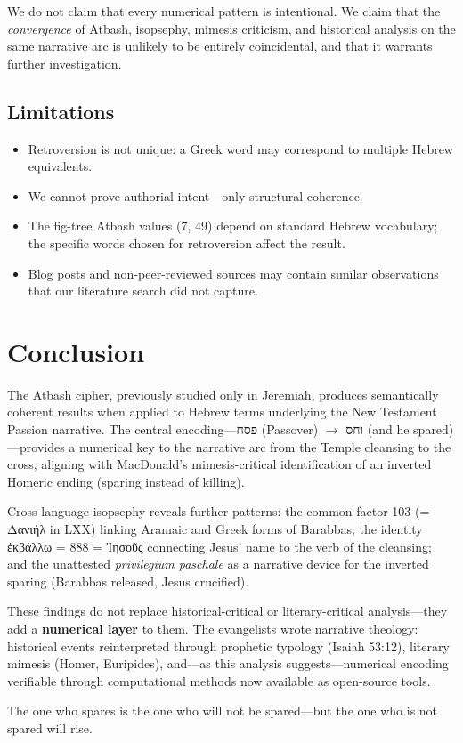 \documentclass[12pt,a4paper]{article}
\begin{document}
We do not claim that every numerical pattern is intentional. We claim that the \textit{convergence} of Atbash, isopsephy, mimesis criticism, and historical analysis on the same narrative arc is unlikely to be entirely coincidental, and that it warrants further investigation.

\subsection{Limitations}

\begin{itemize}
    \item Retroversion is not unique: a Greek word may correspond to multiple Hebrew equivalents.
    \item We cannot prove authorial intent---only structural coherence.
    \item The fig-tree Atbash values (7, 49) depend on standard Hebrew vocabulary; the specific words chosen for retroversion affect the result.
    \item Blog posts and non-peer-reviewed sources may contain similar observations that our literature search did not capture.
\end{itemize}

\section{Conclusion}
\label{sec:conclusion}

The Atbash cipher, previously studied only in Jeremiah, produces semantically coherent results when applied to Hebrew terms underlying the New Testament Passion narrative. The central encoding---פסח (Passover) $\to$ וחס (and he spared)---provides a numerical key to the narrative arc from the Temple cleansing to the cross, aligning with MacDonald's mimesis-critical identification of an inverted Homeric ending (sparing instead of killing).

Cross-language isopsephy reveals further patterns: the common factor 103 (= Δανιήλ in LXX) linking Aramaic and Greek forms of Barabbas; the identity ἐκβάλλω = 888 = Ἰησοῦς connecting Jesus' name to the verb of the cleansing; and the unattested \textit{privilegium paschale} as a narrative device for the inverted sparing (Barabbas released, Jesus crucified).

These findings do not replace historical-critical or literary-critical analysis---they add a \textbf{numerical layer} to them. The evangelists wrote narrative theology: historical events reinterpreted through prophetic typology (Isaiah 53:12), literary mimesis (Homer, Euripides), and---as this analysis suggests---numerical encoding verifiable through computational methods now available as open-source tools.

The one who spares is the one who will not be spared---but the one who is not spared will rise.

\printbibliography
\end{document}
